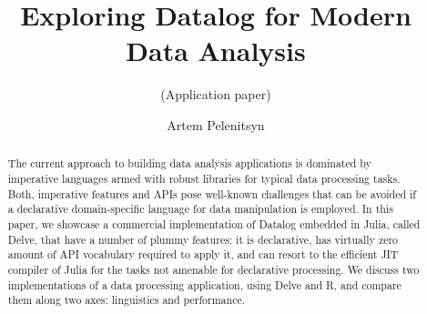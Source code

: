 \documentclass[runningheads]{llncs}
\begin{document}
%
\title{Exploring Datalog for Modern Data Analysis}
\subtitle{(Application paper)}
%
%
\author{%
Artem Pelenitsyn%
}
%
%
%
\maketitle              %
%
\begin{abstract}
The current approach to building data analysis applications is dominated by
imperative languages armed with robust libraries for typical data processing
tasks. Both, imperative features and APIs pose well-known challenges that can
be avoided if a declarative domain-specific language for data manipulation is
employed. In this paper, we showcase a commercial implementation of Datalog
embedded in Julia, called Delve, that have a number of plummy features: it is
declarative, has virtually zero amount of API vocabulary required to apply it,
and can resort to the efficient JIT compiler of Julia for the tasks not
amenable for declarative processing. We discuss two implementations of a data
processing application, using Delve and R, and compare them along two axes:
linguistics and performance.



\end{abstract}
%
%
%



%
%
%


%
\end{document}
